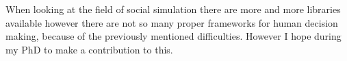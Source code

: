 \documentclass[11pt]{article}
\begin{document}
When looking at the field of social simulation there are more and more libraries available however there are not so many proper frameworks for human decision making, because of the previously mentioned difficulties. However I hope during my PhD to make a contribution to this.




	
\end{document}
